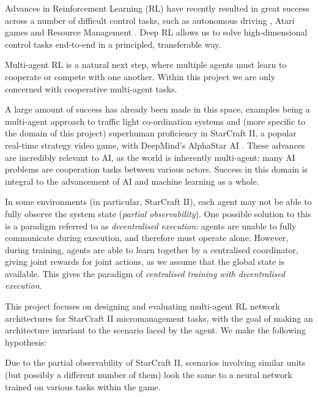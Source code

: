 Advances in Reinforcement Learning (RL) have recently resulted in great success across a number of difficult control tasks, such as autonomous driving \cite{driving}, Atari games \cite{dqn} and Resource Management \cite{resourcemanagement}. Deep RL allows us to solve high-dimensional control tasks end-to-end in a principled, transferable way.

Multi-agent RL is a natural next step, where multiple agents must learn to cooperate or compete with one another. Within this project we are only concerned with cooperative multi-agent tasks. 

A large amount of success has already been made in this space, examples being a multi-agent approach to traffic light co-ordination systems \cite{traffic} and (more specific to the domain of this project) superhuman proficiency in StarCraft II, a popular real-time strategy video game, with DeepMind's AlphaStar AI \cite{alphastar}. These advances are incredibly relevant to AI, as the world is inherently multi-agent: many AI problems are cooperation tasks between various actors. Success in this domain is integral to the advancement of AI and machine learning as a whole.

In some environments (in particular, StarCraft II), each agent may not be able to fully observe the system state (\textit{partial observability}). One possible solution to this is a paradigm referred to as \textit{decentralised execution}: agents are unable to fully communicate during execution, and therefore must operate alone. However, during training, agents are able to learn together by a centralised coordinator, giving joint rewards for joint actions, as we assume that the global state is available. This gives the paradigm of \textit{centralised training with decentralised execution}.







This project focuses on designing and evaluating multi-agent RL network architectures for StarCraft II micromanagement tasks, with the goal of making an architecture invariant to the scenario faced by the agent. We make the following hypothesis:

\begin{hyp} \label{hyp:first}
Due to the partial observability of StarCraft II, scenarios involving similar units (but possibly a different number of them) look the same to a neural network trained on various tasks within the game.
\end{hyp}

